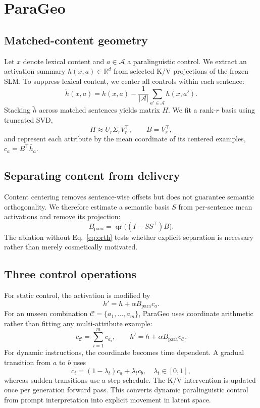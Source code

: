 \documentclass{article}
\begin{document}
\section{ParaGeo}
\subsection{Matched-content geometry}
Let $x$ denote lexical content and $a\in\mathcal{A}$ a paralinguistic control. We extract an activation summary $h(x,a)\in\mathbb{R}^{d}$ from selected K/V projections of the frozen SLM. To suppress lexical content, we center all controls within each sentence:
\begin{equation}
\tilde h(x,a)=h(x,a)-\frac{1}{|\mathcal{A}|}\sum_{a'\in\mathcal{A}}h(x,a').
\label{eq:center}
\end{equation}
Stacking $\tilde h$ across matched sentences yields matrix $H$. We fit a rank-$r$ basis using truncated SVD,
\begin{equation}
H\approx U_r\Sigma_r V_r^\top,\qquad B=V_r^\top,
\end{equation}
and represent each attribute by the mean coordinate of its centered examples, $c_a=B^\top\bar h_a$.

\subsection{Separating content from delivery}
Content centering removes sentence-wise offsets but does not guarantee semantic orthogonality. We therefore estimate a semantic basis $S$ from per-sentence mean activations and remove its projection:
\begin{equation}
B_{\mathrm{para}}=\operatorname{qr}\big((I-SS^\top)B\big).
\label{eq:orth}
\end{equation}
The ablation without Eq.~\eqref{eq:orth} tests whether explicit separation is necessary rather than merely cosmetically motivated.

\subsection{Three control operations}
For static control, the activation is modified by
\begin{equation}
h' = h+\alpha B_{\mathrm{para}}c_a.
\end{equation}
For an unseen combination $\mathcal{C}=\{a_1,\ldots,a_m\}$, ParaGeo uses coordinate arithmetic rather than fitting any multi-attribute example:
\begin{equation}
c_{\mathcal{C}}=\sum_{i=1}^{m}c_{a_i},\qquad h'=h+\alpha B_{\mathrm{para}}c_{\mathcal{C}}.
\label{eq:compose}
\end{equation}
For dynamic instructions, the coordinate becomes time dependent. A gradual transition from $a$ to $b$ uses
\begin{equation}
c_t=(1-\lambda_t)c_a+\lambda_t c_b,\quad \lambda_t\in[0,1],
\label{eq:dynamic}
\end{equation}
whereas sudden transitions use a step schedule. The K/V intervention is updated once per generation forward pass. This converts dynamic paralinguistic control from prompt interpretation into explicit movement in latent space.
\end{document}
